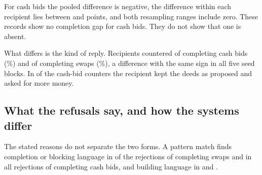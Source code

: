 For cash bids the pooled difference is negative, the difference within each recipient lies between  and  points, and both resampling ranges include zero. These records show no completion gap for cash bids. They do not show that one is absent.

What differs is the kind of reply. Recipients countered  of  completing cash bids (\%) and  of  completing swaps (\%), a difference with the same sign in all five seed blocks. In  of the  cash-bid counters the recipient kept the deeds as proposed and asked for more money.

\subsection{What the refusals say, and how the systems differ}
The stated reasons do not separate the two forms. A pattern match finds completion or blocking language in  of the  rejections of completing swaps and in all  rejections of completing cash bids, and building language in  and .

\begin{table}[t]\centering\small
\TableStyles
\caption{Responses to the  opening swaps and cash bids that would complete only the proposer's group, by recipient. The right-hand columns are regular-expression counts over the public message and applied note of each rejection: building terms (house, hotel, build, develop), reciprocity terms (``in return'', ``for me as well'' and similar) and commitment terms (``never'', ``not for sale'', ``do not counter''). Opus answered  of its  trade responses through action-only recovery, without a note.}
\label{tab:styles}\end{table}

